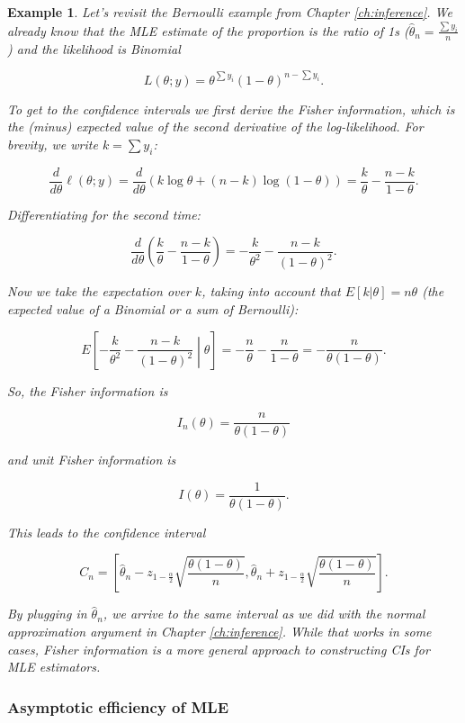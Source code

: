 \documentclass{book}
\theoremstyle{plain}%
\newtheorem{prototheorem}{Example}[section]
\newenvironment{cexample}
   {\colorlet{shadecolor}{gray!10}\begin{shaded}\begin{prototheorem}}
   {\end{prototheorem}\end{shaded}}
\theoremstyle{definition}
\begin{document}
\begin{cexample}{}{}

Let's revisit the Bernoulli example from Chapter \ref{ch:inference}. We already know that the MLE estimate of the proportion is the ratio of 1s ($\hat{\theta}_n = \frac{\sum y_i}{n}$) and the likelihood is Binomial

$$L(\theta; y) = \theta^{\sum y_i} (1 - \theta)^{n - \sum y_i}.$$

To get to the confidence intervals we first derive the Fisher information, which is the (minus) expected value of the second derivative of the log-likelihood. For brevity, we write $k = \sum y_i$:

$$\frac{d}{d\theta} \ell(\theta; y) = \frac{d}{d\theta} \left(k \log \theta + (n - k) \log (1-\theta)\right) = \frac{k}{\theta} - \frac{n - k}{1 - \theta}.$$

Differentiating for the second time:

$$\frac{d}{d\theta} \left(\frac{k}{\theta} - \frac{n - k}{1 - \theta}\right) = -\frac{k}{\theta^2} - \frac{n - k}{(1 - \theta)^2}.$$

Now we take the expectation over $k$, taking into account that $E[k|\theta] = n\theta$ (the expected value of a Binomial or a sum of Bernoulli):

$$E\left[-\frac{k}{\theta^2} - \frac{n - k}{(1 - \theta)^2}\middle|\theta\right] = -\frac{n}{\theta} -\frac{n}{1 - \theta} = -\frac{n}{\theta(1-\theta)}.$$

So, the Fisher information is

$$I_n(\theta) = \frac{n}{\theta(1-\theta)}$$

and unit Fisher information is

$$I(\theta) = \frac{1}{\theta(1-\theta)}.$$

This leads to the confidence interval

$$C_n = \left[\hat{\theta}_n - z_{1 - \frac{\alpha}{2}}\sqrt{\frac{\theta(1-\theta)}{n}},\hat{\theta}_n + z_{1 - \frac{\alpha}{2}}\sqrt{\frac{\theta(1-\theta)}{n}}\right].$$

By plugging in $\hat{\theta}_n$, we arrive to the same interval as we did with the normal approximation argument in Chapter \ref{ch:inference}. While that works in some cases, Fisher information is a more general approach to constructing CIs for MLE estimators.
\end{cexample}


\subsubsection*{Asymptotic efficiency of MLE}
\end{document}
